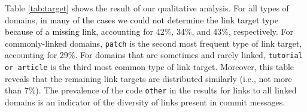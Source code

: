 \documentclass[smallextended]{svjour3}       %
\newcommand{\minor}[1]{\textcolor{black}{#1}}
\begin{document}

Table \ref{tab:target} shows the result of our qualitative analysis. For all types of domains, \minor{in many of the cases we could not determine
the link target type because of a missing link}, accounting for 42\%, 34\%, and 43\%, respectively. For commonly-linked domains, \texttt{patch} is the second most frequent type of link target, accounting for 29\%. For domains that are sometimes and rarely linked, \texttt{tutorial or article} is the third most common type of link target. Moreover, this table reveals that the remaining link targets are distributed similarly (i.e., not more than 7\%). The prevalence of the code \texttt{other} in the results for links to
all linked domains is an indicator of the diversity of links
present in commit messages.
\end{document}
